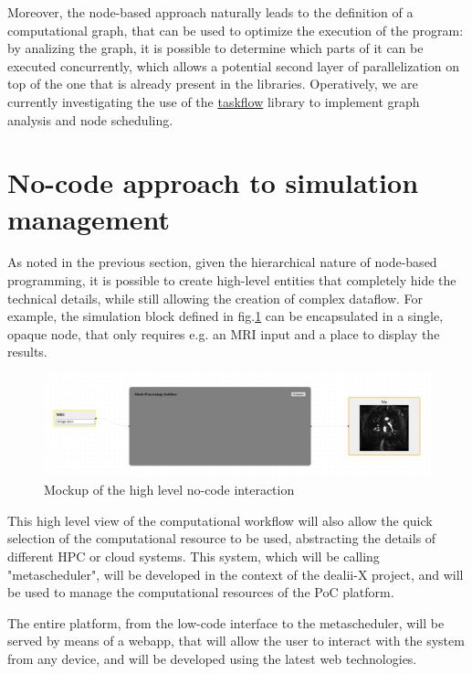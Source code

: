 \documentclass[a4paper,12pt]{article}
\begin{document}
Moreover, the node-based approach naturally leads to the definition of a computational graph, that can be used to optimize the execution of the program: by analizing the graph, it is possible to determine which parts of it can be executed concurrently, which allows a potential second layer of parallelization on top of the one that is already present in the libraries. Operatively, we are currently investigating the use of the \href{https://github.com/taskflow/taskflow}{taskflow} library to implement graph analysis and node scheduling.   

\section{\textcolor{EUblue}{No-code approach to simulation management}}

As noted in the previous section, given the hierarchical nature of node-based programming, it is possible to create high-level entities that completely hide the technical details, while still allowing the creation of complex dataflow. For example, the simulation block defined in fig.\ref{nocode-sim} can be encapsulated in a single, opaque node, that only requires e.g. an MRI input and a place to display the results. 

\begin{figure}
    \label{nocode-sim}
    \includegraphics[width=400pt]{nocode-sim.png}
    \caption{Mockup of the high level no-code interaction}
\end{figure}



This high level view of the computational workflow will also allow the quick selection of the computational resource to be used, abstracting the details of different HPC or cloud systems. This system, which will be calling "metascheduler", will be developed in the context of the dealii-X project, and will be used to manage the computational resources of the PoC platform.

The entire platform, from the low-code interface to the metascheduler, will be served by means of a webapp, that will allow the user to interact with the system from any device, and will be developed using the latest web technologies. 
\end{document}

